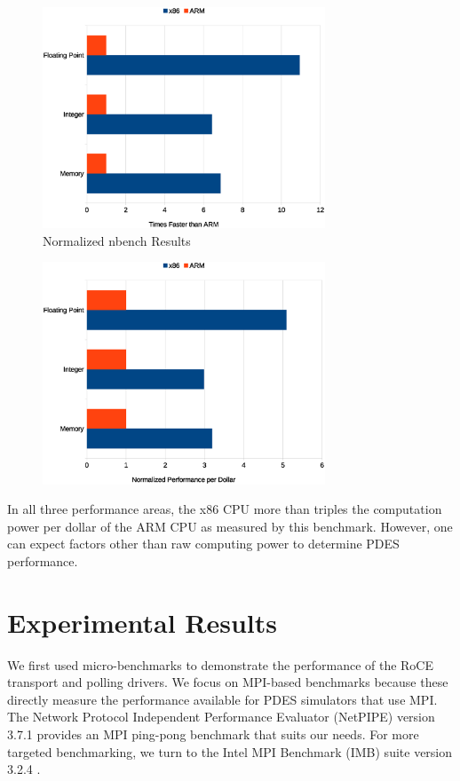 \documentclass[11pt]{book}
\begin{document}
\begin{figure}
\centering
\includegraphics[width=0.75\textwidth]{nbench_performance}
\caption{Normalized nbench Results}
\label{nbench-performance}
\end{figure}


\begin{figure}
\centering
\includegraphics[width=0.75\textwidth]{nbench_cost}
\label{nbench-cost}
\end{figure}

In all three performance areas, the x86 CPU more than triples the computation power per
dollar of the ARM CPU as measured by this benchmark.  However, one can expect factors
other than raw computing power to determine PDES performance.

\chapter{Experimental Results}\label{results}

We first used micro-benchmarks to demonstrate the performance of the RoCE transport and
polling drivers.  We focus on MPI-based benchmarks because these directly measure the
performance available for PDES simulators that use MPI.  The Network Protocol Independent
Performance Evaluator (NetPIPE) \cite{NetPIPE} version 3.7.1 provides an MPI ping-pong
benchmark that suits our needs.  For more targeted benchmarking, we turn to the Intel MPI
Benchmark (IMB) suite version 3.2.4 \cite{intel-mpi}.
\end{document}
